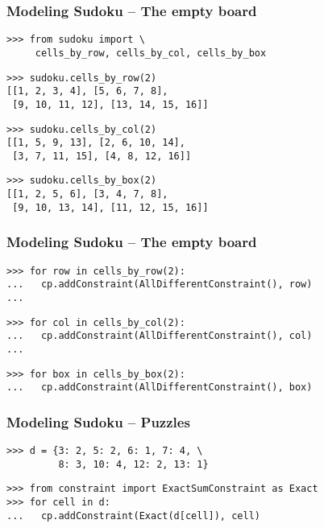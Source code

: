 \documentclass{beamer}
\begin{document}
\begin{frame}[fragile]
\frametitle{Modeling Sudoku -- The empty board}

\begin{lstlisting}
>>> from sudoku import \
     cells_by_row, cells_by_col, cells_by_box
\end{lstlisting}

\pause

\begin{lstlisting}
>>> sudoku.cells_by_row(2)
[[1, 2, 3, 4], [5, 6, 7, 8],
 [9, 10, 11, 12], [13, 14, 15, 16]]
\end{lstlisting}
\pause
\begin{lstlisting}
>>> sudoku.cells_by_col(2)
[[1, 5, 9, 13], [2, 6, 10, 14], 
 [3, 7, 11, 15], [4, 8, 12, 16]]
\end{lstlisting}
\pause
\begin{lstlisting}
>>> sudoku.cells_by_box(2)
[[1, 2, 5, 6], [3, 4, 7, 8], 
 [9, 10, 13, 14], [11, 12, 15, 16]]
\end{lstlisting}

\end{frame}


\begin{frame}[fragile]
\frametitle{Modeling Sudoku -- The empty board}

\begin{lstlisting}
>>> for row in cells_by_row(2):
...   cp.addConstraint(AllDifferentConstraint(), row)
... 
\end{lstlisting}
\pause
\begin{lstlisting}
>>> for col in cells_by_col(2):
...   cp.addConstraint(AllDifferentConstraint(), col)
... 
\end{lstlisting}
\pause
\begin{lstlisting}
>>> for box in cells_by_box(2):
...   cp.addConstraint(AllDifferentConstraint(), box)
\end{lstlisting}

\end{frame}

\begin{frame}[fragile]
\frametitle{Modeling Sudoku -- Puzzles}

\begin{lstlisting}
>>> d = {3: 2, 5: 2, 6: 1, 7: 4, \
         8: 3, 10: 4, 12: 2, 13: 1}
\end{lstlisting}

\pause

\begin{lstlisting}
>>> from constraint import ExactSumConstraint as Exact
>>> for cell in d:
...   cp.addConstraint(Exact(d[cell]), cell)
\end{lstlisting}

\end{frame}
\end{document}

